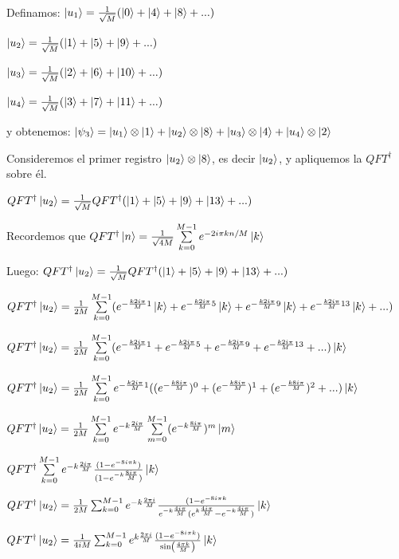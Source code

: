\documentclass[11pt, spanish]{report}
\begin{document}
Definamos: $\ket{u_1} = \frac{1}{\sqrt{M}} (\ket{0} + \ket{4} + \ket{8} + ...)$

$\ket{u_2} = \frac{1}{\sqrt{M}} (\ket{1} + \ket{5} + \ket{9} + ...)$

$\ket{u_3} = \frac{1}{\sqrt{M}} (\ket{2} + \ket{6} + \ket{10} + ...)$

$\ket{u_4} = \frac{1}{\sqrt{M}} (\ket{3} + \ket{7} + \ket{11} + ...)$

y obtenemos: $\ket{\psi_3} = \ket{u_1} \otimes \ket{1} + \ket{u_2} \otimes \ket{8} + \ket{u_3} \otimes \ket{4} + \ket{u_4} \otimes \ket{2}$

Consideremos el primer registro $\ket{u_2} \otimes \ket{8}$, es decir $\ket{u_2}$, y apliquemos la $QFT^\dagger$ sobre él.

$QFT^\dagger \ket{u_2} = \frac{1}{\sqrt{M}} QFT^\dagger (\ket{1} + \ket{5} + \ket{9} + \ket{13} + ...)$

Recordemos que $QFT^\dagger \ket{n} = \frac{1}{\sqrt{4 M}} \sum\limits_{k=0}^{M-1} e^{-2 i \pi k n /M} \ket{k}$

Luego: $QFT^\dagger \ket{u_2} = \frac{1}{\sqrt{M}} QFT^\dagger (\ket{1} + \ket{5} + \ket{9} + \ket{13} + ...)$

$QFT^\dagger \ket{u_2} = \frac{1}{2M} \sum\limits_{k=0}^{M-1} (e^{- \frac{k 2 i \pi}{M} 1} \ket{k} + e^{- \frac{k 2 i \pi}{M} 5} \ket{k} + e^{- \frac{k 2 i \pi}{M} 9} \ket{k} + e^{- \frac{k 2 i \pi}{M} 13} \ket{k} + ...)$


$QFT^\dagger \ket{u_2} = \frac{1}{2M} \sum\limits_{k=0}^{M-1} (e^{- \frac{k 2 i \pi}{M} 1} + e^{- \frac{k 2 i \pi}{M} 5} + e^{- \frac{k 2 i \pi}{M} 9} + e^{- \frac{k 2 i \pi}{M} 13} + ...) \ket{k}$

$QFT^\dagger \ket{u_2} = \frac{1}{2M} \sum\limits_{k=0}^{M-1} e^{- \frac{k 2 i \pi}{M} 1} ((e^{- \frac{k 8 i \pi}{M}})^0 + (e^{- \frac{k 8 i \pi}{M}})^1 + (e^{- \frac{k 8 i \pi}{M}})^2 + ...) \ket{k}$

$QFT^\dagger \ket{u_2} = \frac{1}{2M} \sum\limits_{k=0}^{M-1} e^{-k \frac{2 i \pi}{M}} \sum\limits_{m=0}^{M-1} (e^{-k \frac{8 i \pi}{M}})^m \ket{m}$

$QFT^\dagger \sum\limits_{k=0}^{M-1} e^{-k \frac{2 i \pi}{M}} \frac{(1-e^{-8 i \pi k})}{(1 - e^{-k \frac{8 i \pi}{M}})} \ket{k}$

$QFT^\dagger \ket{u_2} = \frac{1}{2M} \sum_{k=0}^{M-1} e^{-k \frac{2 \pi i}{M}} \frac{(1 - e^{-8 i \pi k}}{e^{-k \frac{4 i \pi}{M}} (e^{k \frac{4 i \pi}{M}} - e^{-k \frac{4 i \pi}{M}})} \ket{k}$

$QFT^\dagger \ket{u_2} = \frac{1}{4 i M} \sum_{k=0}^{M-1} e^{k \frac{2 \pi i}{M}} \frac{(1 - e^{-8 i \pi k})}{\sin(\frac{4\pi k}{M})} \ket{k}$
\end{document}
